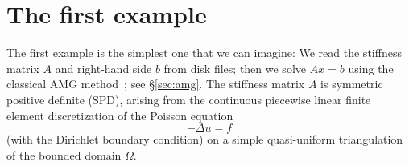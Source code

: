 \documentclass[11pt]{memoir}
\begin{document}
\section{The first example}\label{sec:ex1}

The first example is the simplest one that we can imagine: We read the stiffness matrix $A$ and right-hand side $b$ from disk files; then we solve $Ax=b$ using the classical AMG method~\cite{Brandt.BrandtMcCormick.1982uq,Ruge.RugeStuben.1985ij,Ruge.RugeStuben.1987bs}; see \S\ref{sec:amg}. The stiffness matrix $A$ is symmetric positive definite (SPD), arising from the continuous piecewise linear finite element discretization of the Poisson equation 
$$-\Delta u = f$$ 
(with the Dirichlet boundary condition) on a simple quasi-uniform triangulation of the bounded domain $\Omega$.
\end{document}
